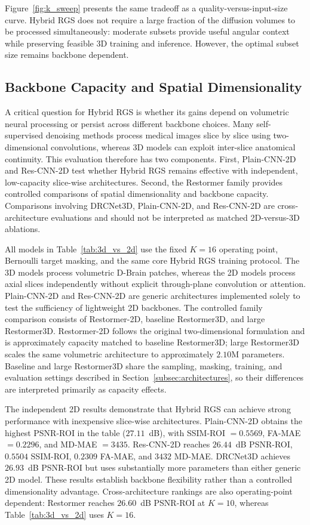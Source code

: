 \documentclass[preprint,12pt]{elsarticle}
\begin{document}
Figure~\ref{fig:k_sweep} presents the same tradeoff as a quality-versus-input-size curve. Hybrid RGS does not require a large fraction of the diffusion volumes to be processed simultaneously: moderate subsets provide useful angular context while preserving feasible 3D training and inference. However, the optimal subset size remains backbone dependent.

\subsection{Backbone Capacity and Spatial Dimensionality}
\label{subsec:capacity_dimensionality}
A critical question for Hybrid RGS is whether its gains depend on volumetric neural processing or persist across different backbone choices. Many self-supervised denoising methods process medical images slice by slice using two-dimensional convolutions, whereas 3D models can exploit inter-slice anatomical continuity. This evaluation therefore has two components. First, Plain-CNN-2D and Res-CNN-2D test whether Hybrid RGS remains effective with independent, low-capacity slice-wise architectures. Second, the Restormer family provides controlled comparisons of spatial dimensionality and backbone capacity. Comparisons involving DRCNet3D, Plain-CNN-2D, and Res-CNN-2D are cross-architecture evaluations and should not be interpreted as matched 2D-versus-3D ablations.

All models in Table~\ref{tab:3d_vs_2d} use the fixed $K=16$ operating point, Bernoulli target masking, and the same core Hybrid RGS training protocol. The 3D models process volumetric D-Brain patches, whereas the 2D models process axial slices independently without explicit through-plane convolution or attention. Plain-CNN-2D and Res-CNN-2D are generic architectures implemented solely to test the sufficiency of lightweight 2D backbones. The controlled family comparison consists of Restormer-2D, baseline Restormer3D, and large Restormer3D. Restormer-2D follows the original two-dimensional formulation and is approximately capacity matched to baseline Restormer3D; large Restormer3D scales the same volumetric architecture to approximately $2.10$M parameters. Baseline and large Restormer3D share the sampling, masking, training, and evaluation settings described in Section~\ref{subsec:architectures}, so their differences are interpreted primarily as capacity effects.

The independent 2D results demonstrate that Hybrid RGS can achieve strong performance with inexpensive slice-wise architectures. Plain-CNN-2D obtains the highest PSNR-ROI in the table ($27.11$~dB), with SSIM-ROI $=0.5569$, FA-MAE $=0.2296$, and MD-MAE $=3435$. Res-CNN-2D reaches $26.44$~dB PSNR-ROI, $0.5504$ SSIM-ROI, $0.2309$ FA-MAE, and $3432$ MD-MAE. DRCNet3D achieves $26.93$~dB PSNR-ROI but uses substantially more parameters than either generic 2D model. These results establish backbone flexibility rather than a controlled dimensionality advantage. Cross-architecture rankings are also operating-point dependent: Restormer reaches $26.60$~dB PSNR-ROI at $K=10$, whereas Table~\ref{tab:3d_vs_2d} uses $K=16$.
\end{document}
